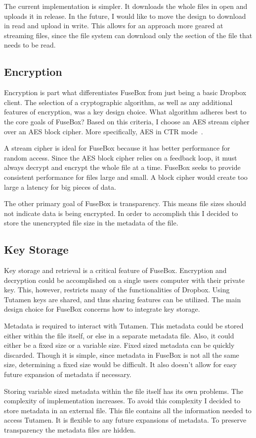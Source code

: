 \documentclass[11pt,twocolumn,letterpaper]{article}
\newcommand{\appname}{FuseBox }
\newcommand{\appnameWOspace}{FuseBox}
\newcommand{\custos}{Tutamen }
\newcommand{\custosWOspace}{Tutamen}
\begin{document}
The
current implementation is simpler. It downloads the whole files in
open and uploads it in
release. In the future, I would like to move the design to download in
read and upload in write. This allows for an approach more geared at
streaming files, since the file system can download only the section of the file that
needs to be read. 

\subsection{Encryption}
\label{sec:enc}
Encryption is part what differentiates \appname from just being a basic
Dropbox client. The selection of a cryptographic algorithm, as well as
any additional features of encryption, was a key design choice. What
algorithm adheres best to the core goals of \appnameWOspace? Based on
this criteria, I choose an AES stream cipher over an AES block
cipher. More specifically, AES in CTR mode~\cite{AESCTR}.  
\par A stream cipher is ideal for \appname because it has better
performance for random access. Since the AES block 
cipher relies on a feedback loop, it must always decrypt and encrypt
the whole file at a time. \appname seeks to provide consistent
performance for files large and small. A block cipher would create
too large a latency for big pieces of data.   
\par The other primary goal of \appname is transparency. This means
file sizes should not indicate data is being encrypted. In order to
accomplish this I decided to store the unencrypted file size in the
metadata of the file. 

\subsection{Key Storage}
\label{sec:keystorage}
Key storage and retrieval is a critical feature of \appnameWOspace. 
Encryption and decryption could be accomplished on a single users
computer with their private key. This, however, restricts many of the
functionalities of Dropbox. Using \custos keys are shared, and thus 
sharing features can be utilized. The main design choice for \appname
concerns how to integrate key storage.  
\par Metadata is required to interact with \custosWOspace. This
metadata could be stored either within the file itself, or else in a
separate metadata file. Also, it could either be a fixed size or a
variable size. Fixed sized metadata can be quickly discarded. Though
it is simple, since metadata in \appname is not all the same size,
determining a fixed size would be difficult. It also doesn't allow for
easy future expansion of metadata if necessary. 
\par Storing variable sized metadata within the file itself has its
own problems. The complexity of implementation increases. To avoid
this complexity I decided to store metadata in an external file. This
file contains all the information needed to access \custosWOspace. It
is flexible to any future expansions of metadata. 
To preserve transparency the metadata files are hidden. 
\end{document}
